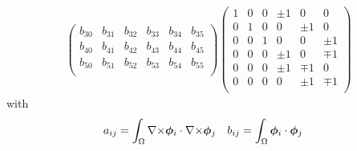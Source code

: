 \begin{gather*}
\begin{pmatrix}
b_{30} & b_{31} & b_{32} & b_{33} & b_{34} & b_{35}\\
b_{40} & b_{41} & b_{42} & b_{43} & b_{44} & b_{45}\\
b_{50} & b_{51} & b_{52} & b_{53} & b_{54} & b_{55}\\
\end{pmatrix}\begin{pmatrix}
1 & 0 & 0 & \pm 1 & 0 & 0\\
0 & 1 & 0 & 0 & \pm 1 & 0\\
0 & 0 & 1 & 0 & 0 & \pm 1\\
0 & 0 & 0 & \pm 1 & 0 & \mp 1\\
0 & 0 & 0 & \pm 1 & \mp 1 & 0\\
0 & 0 & 0 & 0 & \pm 1 & \mp 1\\
\end{pmatrix}
\end{gather*}
with 
\begin{align*}
a_{ij} &= \int_\Omega {\nabla\times}\bm{\phi}_i\cdot{\nabla\times}\bm{\phi}_j &
b_{ij} &= \int_\Omega \bm{\phi}_i\cdot\bm{\phi}_j
\end{align*}


